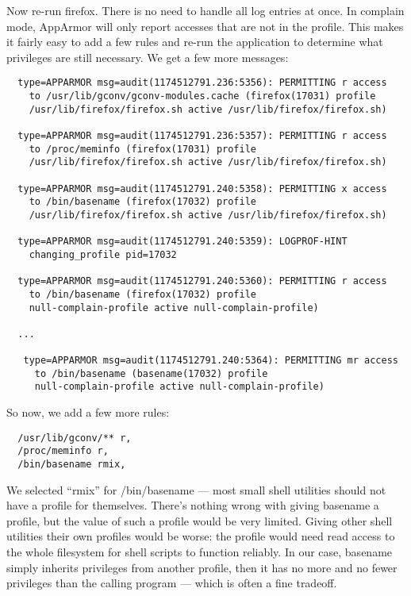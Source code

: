 \documentclass[a4paper]{article}
\begin{document}
Now re-run firefox. There is no need to handle all log entries at once.
In complain mode, AppArmor will only report accesses that are not in the
profile. This makes it fairly easy to add a few rules and re-run the
application to determine what privileges are still necessary.  We get a
few more messages:

\begin{small}
\begin{verbatim}
  type=APPARMOR msg=audit(1174512791.236:5356): PERMITTING r access
    to /usr/lib/gconv/gconv-modules.cache (firefox(17031) profile
    /usr/lib/firefox/firefox.sh active /usr/lib/firefox/firefox.sh)

  type=APPARMOR msg=audit(1174512791.236:5357): PERMITTING r access
    to /proc/meminfo (firefox(17031) profile
    /usr/lib/firefox/firefox.sh active /usr/lib/firefox/firefox.sh)

  type=APPARMOR msg=audit(1174512791.240:5358): PERMITTING x access
    to /bin/basename (firefox(17032) profile
    /usr/lib/firefox/firefox.sh active /usr/lib/firefox/firefox.sh)

  type=APPARMOR msg=audit(1174512791.240:5359): LOGPROF-HINT
    changing_profile pid=17032

  type=APPARMOR msg=audit(1174512791.240:5360): PERMITTING r access
    to /bin/basename (firefox(17032) profile
    null-complain-profile active null-complain-profile)

  ...

   type=APPARMOR msg=audit(1174512791.240:5364): PERMITTING mr access
     to /bin/basename (basename(17032) profile
     null-complain-profile active null-complain-profile)
\end{verbatim}
\end{small}


So now, we add a few more rules:

\begin{small}
\begin{verbatim}
  /usr/lib/gconv/** r,
  /proc/meminfo r,
  /bin/basename rmix,
\end{verbatim}
\end{small}

We selected ``rmix'' for /bin/basename --- most small shell utilities
should not have a profile for themselves.  There's nothing wrong with
giving basename a profile, but the value of such a profile would be very
limited. Giving other shell utilities their own profiles would be worse:
the profile would need read access to the whole filesystem for shell
scripts to function reliably. In our case, basename simply inherits
privileges from another profile, then it has no more and no fewer
privileges than the calling program --- which is often a fine tradeoff.
\end{document}
